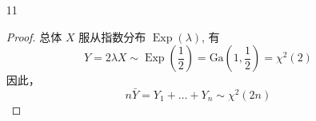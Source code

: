 \documentclass[normal,founder,mtpro2,cn]{elegantnote}
\begin{document}
\begin{enumerate}
\begin{proof}
\begin{enumerate}
\begin{equation*}
                      \end{equation*}
                      故 $\mu_{1}-\mu_{2}$ 的置信水平为 95\% 的置信区间为
                      \begin{equation*}
                          \left[\left(82-76\right) \pm 2.0930 \times \sqrt{\frac{56.5}{10}+\frac{52.4}{15}}\right]=[-0.3288,12.3288]
                      \end{equation*}
                \item $\sigma_{1}^{2}/\sigma_{2}^{2}$ 的置信水平为 $1-\alpha$ 的置信区间为
                      \begin{equation*}
                          \left[\frac{s_{x}^{2}}{s_{y}^{2}}\cdot\frac{1}{F_{1-\alpha/2}\left(n_{1}-1,n_{2}-1\right)},\frac{s_{x}^{2}}{s_{y}^{2}}\cdot\frac{1}{F_{\alpha/2}\left(n_{1}-1,n_{2}-1\right)}\right]
                      \end{equation*}
                      给定置信度 $1-\alpha=0.95$，对于 $n_{1}=10,n_{2}=15$，有
                      \begin{gather*}
                          F_{1-\alpha/2}\left(n_{1}-1,n_{2}-1\right)=F_{0.975}(9,14)=3.21 \\
                          F_{\alpha/2}\left(n_{1}-1,n_{2}-1\right)=F_{0.025}(9,14)=\frac{1}{F_{0.975}(14,9)}=\frac{1}{3.80}
                      \end{gather*}
                      且有 $s_{x}^{2}=56.5,\quad s_{y}^{2}=52.4$。故 $\sigma_{1}^{2}/\sigma_{2}^{2}$ 的置信水平为 95\% 的置信区间为
                      \begin{equation*}
                          \left[\frac{56.50}{52.4}\times\frac{1}{3.21},\frac{56.50}{52.4}\times 3.80\right]=[0.3359,4.0973]
                      \end{equation*}
            \end{enumerate}
        \end{proof}
    \item[11]
        \begin{proof}
            总体 $X$ 服从指数分布 $\operatorname{Exp}(\lambda)$, 有
            \begin{equation*}
                Y=2\lambda X\sim\operatorname{Exp}\left(\frac{1}{2}\right)=\text{Ga}\left(1,\frac{1}{2}\right)=\chi^{2}(2)
            \end{equation*}
            因此，
            \begin{equation*}
                n\bar{Y}=Y_{1}+\ldots+Y_{n}\sim\chi^{2}(2n)
            \end{equation*}

\end{proof}
\end{enumerate}
\end{document}
